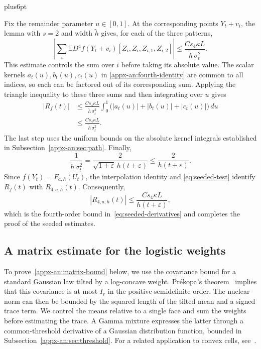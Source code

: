 \documentclass[11pt,letterpaper,twoside,leqno]{article}
\makeatletter
\theoremstyle{bookplain}
\theoremstyle{bookremark}
\renewenvironment{proof}[1][\proofname]{\par
  \pushQED{\qed}\normalfont\topsep6pt plus6pt\relax
  \trivlist\item[\hskip\labelsep\bfseries #1\@addpunct{.}]\ignorespaces
}{\popQED\endtrivlist\@endpefalse}
\newcommand{\E}{\mathbb E}
\newcommand{\dd}{\,d}
\makeatother
\begin{document}
\begin{proof}[Proof of the seeded estimates~\eqref{eq:seeded-derivatives}]
Fix the remainder parameter $u\in[0,1]$. At the corresponding
points $Y_t+v_i$, the lemma with $s=2$ and width
$\widetilde h$ gives, for each of the three patterns,
\[
 \left|\sum_i\E D^4f(Y_t+v_i)
                [Z_i,Z_i,Z_{i,1},Z_{i,2}]\right|
 \le\frac{Cs_4\kappa L}{\widetilde h\,\sigma_t^2}.
\]
This estimate controls the sum over $i$ before taking its
absolute value. The scalar kernels $a_t(u),b_t(u),c_t(u)$ in
\eqref{appx-an:fourth-identity} are common to all indices, so
each can be factored out of its corresponding sum. Applying
the triangle inequality to these three sums and then integrating
over $u$ gives
\[
 \begin{aligned}
 |R_f(t)|
 &\le\frac{Cs_4\kappa L}{\widetilde h\,\sigma_t^2}
       \int_0^1\bigl(|a_t(u)|+|b_t(u)|+|c_t(u)|\bigr)\dd u\\
 &\le\frac{Cs_4\kappa L}{\widetilde h\,\sigma_t^2}.
 \end{aligned}
\]
The last step uses the uniform bounds on the absolute kernel
integrals established in Subsection~\ref{appx-an:sec:path}.
Finally,
\[
 \frac1{\widetilde h\,\sigma_t^2}
 =\frac{2}{\sqrt{1+\varepsilon}\,h(t+\varepsilon)}
 \le\frac{2}{h(t+\varepsilon)}.
\]
Since $f(Y_t)=F_{a,h}(U_t)$, the interpolation identity and
\eqref{eq:seeded-test} identify $R_f(t)$ with
$R_{4,a,h}(t)$. Consequently,
\[
 |R_{4,a,h}(t)|\le\frac{Cs_4\kappa L}{h(t+\varepsilon)},
\]
which is the fourth-order bound in~\eqref{eq:seeded-derivatives}
and completes the proof of the seeded estimates.
\end{proof}


\subsection{A matrix estimate for the logistic weights}
\label{appx-an:sec:matrix}

{To prove~\eqref{appx-an:matrix-bound} below, we use the covariance bound for}
a standard Gaussian law tilted by a log-concave weight. Pr\'ekopa's
theorem~\cite[Theorem~6]{Prekopa1973} implies that this covariance is
at most \(I_r\) in the positive-semidefinite order. The nuclear norm
can then be bounded by the squared length of the tilted mean and a
signed trace term. We control the means relative to a single face and sum the
weights before estimating the trace. A Gamma mixture expresses the
latter through a common-threshold derivative of a Gaussian distribution
function, bounded in Subsection~\ref{appx-an:sec:threshold}.
For a related application to convex cells,
see~\cite[Lemma~12]{GaoZhang}.
\end{document}
